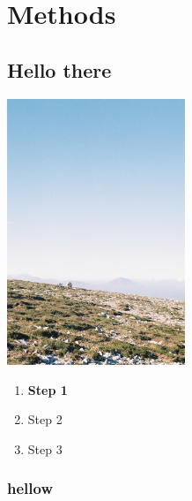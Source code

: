 \section{Methods}

\subsection{Hello there}

\begin{center}
    \includegraphics[width = 0.4\textwidth]{images/000024.JPG}
\end{center}

\begin{enumerate}
    \item \textbf {Step 1}
    \item Step 2 
    \item Step 3
\end{enumerate} 

\subsubsection{hellow}